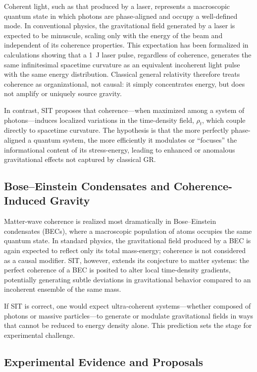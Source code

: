 Coherent light, such as that produced by a laser, represents a macroscopic quantum state in which photons are phase-aligned and occupy a well-defined mode. In conventional physics, the gravitational field generated by a laser is expected to be minuscule, scaling only with the energy of the beam and independent of its coherence properties. This expectation has been formalized in calculations showing that a 1~J laser pulse, regardless of coherence, generates the same infinitesimal spacetime curvature as an equivalent incoherent light pulse with the same energy distribution. Classical general relativity therefore treats coherence as organizational, not causal: it simply concentrates energy, but does not amplify or uniquely source gravity.

In contrast, SIT proposes that coherence---when maximized among a system of photons---induces localized variations in the time-density field, $\rho_t$, which couple directly to spacetime curvature. The hypothesis is that the more perfectly phase-aligned a quantum system, the more efficiently it modulates or ``focuses'' the informational content of its stress-energy, leading to enhanced or anomalous gravitational effects not captured by classical GR.

\subsection{Bose--Einstein Condensates and Coherence-Induced Gravity}

Matter-wave coherence is realized most dramatically in Bose--Einstein condensates (BECs), where a macroscopic population of atoms occupies the same quantum state. In standard physics, the gravitational field produced by a BEC is again expected to reflect only its total mass-energy; coherence is not considered as a causal modifier. SIT, however, extends its conjecture to matter systems: the perfect coherence of a BEC is posited to alter local time-density gradients, potentially generating subtle deviations in gravitational behavior compared to an incoherent ensemble of the same mass.

If SIT is correct, one would expect ultra-coherent systems---whether composed of photons or massive particles---to generate or modulate gravitational fields in ways that cannot be reduced to energy density alone. This prediction sets the stage for experimental challenge.


\subsection{Experimental Evidence and Proposals}

